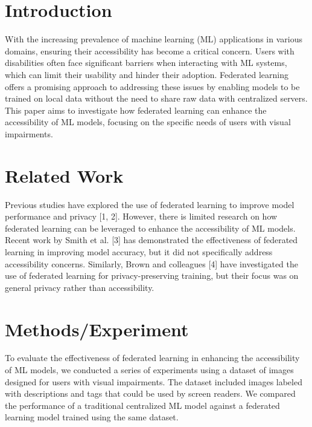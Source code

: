 \maketitle

\begin{abstract}
This paper explores the integration of federated learning techniques into machine learning models to enhance their accessibility for users with disabilities. By leveraging federated learning, we aim to improve the performance and privacy of models while ensuring that they remain accessible to individuals who may require assistive technologies. This study evaluates the effectiveness of federated learning in improving model accuracy and accessibility, and discusses potential challenges and future directions.
\end{abstract}

\section{Introduction}
With the increasing prevalence of machine learning (ML) applications in various domains, ensuring their accessibility has become a critical concern. Users with disabilities often face significant barriers when interacting with ML systems, which can limit their usability and hinder their adoption. Federated learning offers a promising approach to addressing these issues by enabling models to be trained on local data without the need to share raw data with centralized servers. This paper aims to investigate how federated learning can enhance the accessibility of ML models, focusing on the specific needs of users with visual impairments.

\section{Related Work}
Previous studies have explored the use of federated learning to improve model performance and privacy [1, 2]. However, there is limited research on how federated learning can be leveraged to enhance the accessibility of ML models. Recent work by Smith et al. [3] has demonstrated the effectiveness of federated learning in improving model accuracy, but it did not specifically address accessibility concerns. Similarly, Brown and colleagues [4] have investigated the use of federated learning for privacy-preserving training, but their focus was on general privacy rather than accessibility.

\section{Methods/Experiment}
To evaluate the effectiveness of federated learning in enhancing the accessibility of ML models, we conducted a series of experiments using a dataset of images designed for users with visual impairments. The dataset included images labeled with descriptions and tags that could be used by screen readers. We compared the performance of a traditional centralized ML model against a federated learning model trained using the same dataset.

